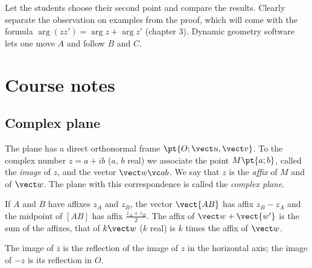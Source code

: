 \begin{teachernote}
Let the students choose their second point and compare the results. Clearly separate the observation on examples from the proof, which will come with the formula $\arg(zz')=\arg z+\arg z'$ (chapter 3). Dynamic geometry software lets one move $A$ and follow $B$ and $C$.
\end{teachernote}

\mxnewpage
\section{Course notes}
\subsection{Complex plane}
\begin{definition}
The plane has a direct orthonormal frame $\pt{O;\vect u,\vect v}$. To the complex number $z=a+ib$ ($a$, $b$ real) we associate the point $M\pt{a;b}$, called the \emph{image} of $z$, and the vector $\vect w\vc ab$. We say that $z$ is the \emph{affix} of $M$ and of $\vect w$. The plane with this correspondence is called the \emph{complex plane}.
\end{definition}
\begin{theorem}
If $A$ and $B$ have affixes $z_A$ and $z_B$, the vector $\vect{AB}$ has affix $z_B-z_A$ and the midpoint of $[AB]$ has affix $\frac{z_A+z_B}2$. The affix of $\vect w+\vect{w'}$ is the sum of the affixes, that of $k\vect w$ ($k$ real) is $k$ times the affix of $\vect w$.\par
The image of $\overline z$ is the reflection of the image of $z$ in the horizontal axis; the image of $-z$ is its reflection in $O$.
\end{theorem}

